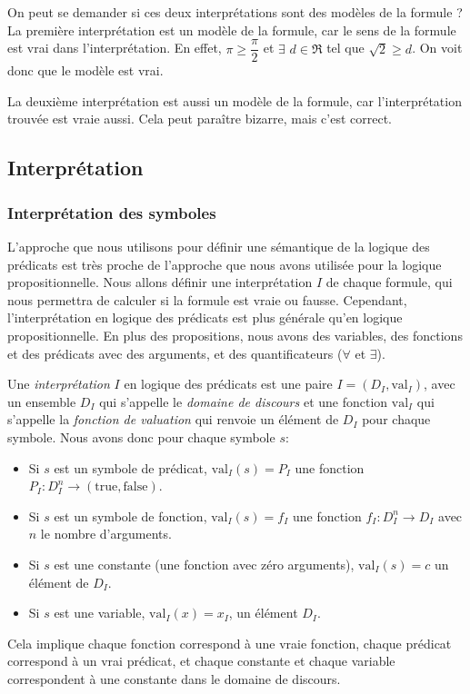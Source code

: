 On peut se demander si ces deux interprétations sont des modèles de la formule ? \\
La première interprétation est un modèle de la formule, car le sens de la formule est vrai dans l'interprétation. En effet, $\pi \geq \dfrac{\pi}{2}$ et $\exists$ $ d \in \Re$ tel que $\sqrt2 \geq d$. On voit donc que le modèle est vrai.

La deuxième interprétation est aussi un modèle de la formule, car l'interprétation trouvée est vraie aussi. Cela peut paraître bizarre, mais c'est correct. 

\subsection{Interprétation}

\subsubsection{Interprétation des symboles}

L'approche que nous utilisons pour définir une sémantique de la logique des prédicats est très proche 
de l'approche que nous avons utilisée pour la logique propositionnelle.
Nous allons définir une interprétation $I$ de chaque formule, qui nous permettra de calculer si la formule est vraie ou fausse.
Cependant, l'interprétation en logique des prédicats est plus générale qu'en logique propositionnelle.
En plus des propositions, nous avons des variables, des fonctions et des prédicats avec des arguments,
et des quantificateurs ($\forall$ et $\exists$).

Une {\em interprétation} $I$ en logique des prédicats est une paire $I = (D_I, \mathrm{val}_I)$,
avec un ensemble $D_I$ qui s'appelle le {\em domaine de discours} et une fonction $\mathrm{val}_I$ qui s'appelle
la {\em fonction de valuation} qui renvoie un élément de $D_I$ pour chaque symbole.
Nous avons donc pour chaque symbole $s$:
\begin{itemize}
\item Si $s$ est un symbole de prédicat,
 $\mathrm{val}_{I}(s) = P_{I}$ une fonction $P_{I}:D_{I}^{n} \rightarrow (\mathrm{true},\mathrm{false})$.
\item Si $s$ est un symbole de fonction,
 $\mathrm{val}_I(s) = f_I$ une fonction $f_{I}:D_{I}^{n} \rightarrow D_{I}$ avec $n$ le nombre d'arguments.
\item Si $s$ est une constante (une fonction avec zéro arguments),
 $\mathrm{val}_I(s) = c$ un élément de $D_I$.
\item Si $s$ est une variable,
 $\mathrm{val}_{I}(x) = x_{I}$, un élément $D_{I}$.
\end{itemize}
Cela implique chaque fonction correspond à une vraie fonction, chaque prédicat
correspond à un vrai prédicat, et chaque constante et chaque variable correspondent à une constante dans le domaine de discours.

